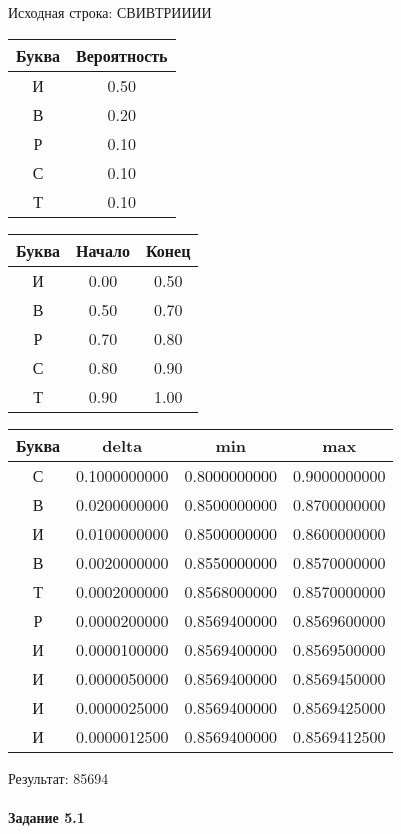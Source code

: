 \documentclass[a4paper, 12pt]{article}
\begin{document}
Исходная строка: СВИВТРИИИИ\
\begin{center}
 \begin{tabular}{ |c|c| } 
  \hline
     Буква & Вероятность \\ \hline
И & 0.50\\\hline
В & 0.20\\\hline
Р & 0.10\\\hline
С & 0.10\\\hline
Т & 0.10
\\ \hline \end{tabular}
\end{center}
\begin{center}
 \begin{tabular}{ |c|c|c| } 
  \hline
     Буква & Начало & Конец \\ \hline
И & 0.00 & 0.50\\\hline
В & 0.50 & 0.70\\\hline
Р & 0.70 & 0.80\\\hline
С & 0.80 & 0.90\\\hline
Т & 0.90 & 1.00
\\ \hline \end{tabular}
\end{center}
\begin{center}
 \begin{tabular}{ |c|c|c|c| } 
  \hline
     Буква & delta & min & max \\ \hline
С & 0.1000000000 & 0.8000000000 & 0.9000000000\\\hline
В & 0.0200000000 & 0.8500000000 & 0.8700000000\\\hline
И & 0.0100000000 & 0.8500000000 & 0.8600000000\\\hline
В & 0.0020000000 & 0.8550000000 & 0.8570000000\\\hline
Т & 0.0002000000 & 0.8568000000 & 0.8570000000\\\hline
Р & 0.0000200000 & 0.8569400000 & 0.8569600000\\\hline
И & 0.0000100000 & 0.8569400000 & 0.8569500000\\\hline
И & 0.0000050000 & 0.8569400000 & 0.8569450000\\\hline
И & 0.0000025000 & 0.8569400000 & 0.8569425000\\\hline
И & 0.0000012500 & 0.8569400000 & 0.8569412500
\\ \hline \end{tabular}
\end{center}
Результат: 85694
\pagebreak
\paragraph{Задание 5.1}
\end{document}
